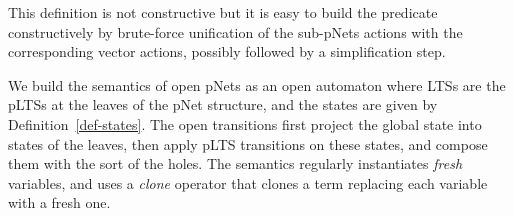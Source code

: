 \documentclass{lncs/llncs}
\begin{document}
This definition is not constructive but it is easy to build the predicate constructively
by brute-force unification of the sub-pNets
actions with the corresponding vector actions, possibly followed by a simplification
step.


We build the semantics of open pNets as an open automaton where LTSs are the pLTSs at
the leaves of the pNet structure, and the states are given by 
Definition~\ref{def-states}. The open transitions first
 project the global state into states of the leaves, then apply
pLTS transitions on these states, and compose them with the sort of the holes. %
The semantics   regularly instantiates \emph{fresh} variables, and uses a
\emph{clone} operator that clones a term replacing each variable with a
fresh one.
\end{document}
